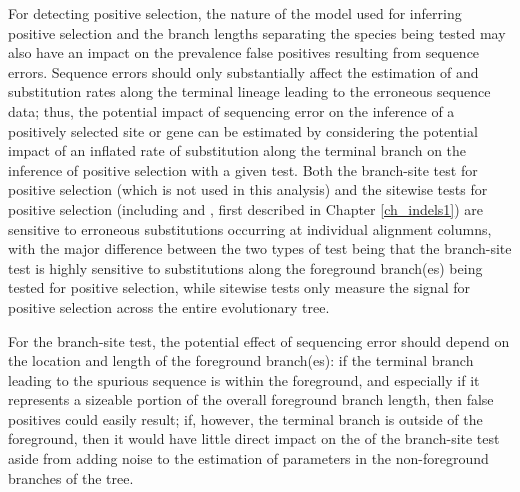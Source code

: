 For detecting positive selection, the nature of the model used for
inferring positive selection and the branch lengths separating the
species being tested may also have an impact on the prevalence false
positives resulting from sequence errors. Sequence errors should only
substantially affect the estimation of \nsyn and \syn substitution
rates along the terminal lineage leading to the erroneous sequence
data; thus, the potential impact of sequencing error on the inference
of a positively selected site or gene can be estimated by considering
the potential impact of an inflated rate of \nsyn substitution along
the terminal branch on the inference of positive selection with a
given test. Both the branch-site test for positive selection (which is
not used in this analysis) and the sitewise tests for positive
selection (including \pamlEight and \slr, first described in Chapter
\ref{ch_indels1}) are sensitive to erroneous substitutions occurring
at individual alignment columns, with the major difference between the
two types of test being that the branch-site test is highly sensitive
to substitutions along the foreground branch(es) being tested for
positive selection, while sitewise tests only measure the signal for
positive selection across the entire evolutionary tree.

For the branch-site test, the potential effect of sequencing error
should depend on the location and length of the foreground branch(es):
if the terminal branch leading to the spurious sequence is within the
foreground, and especially if it represents a sizeable portion of the
overall foreground branch length, then false positives could easily
result; if, however, the terminal branch is outside of the foreground,
then it would have little direct impact on the \fpr of the branch-site
test aside from adding noise to the estimation of parameters in the
non-foreground branches of the tree.


